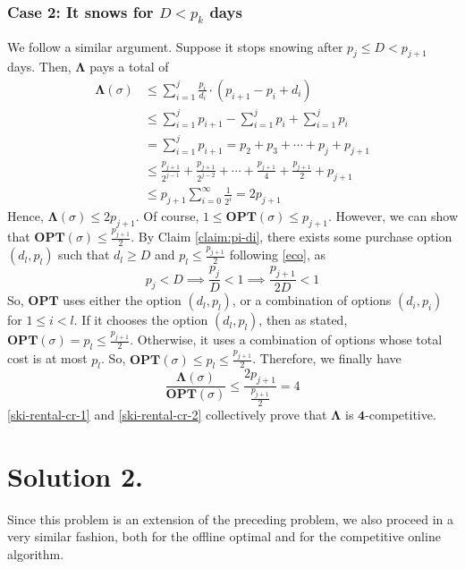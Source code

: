 \documentclass[11pt]{article}
\begin{document}
\subsubsection*{Case 2: It snows for $D < p_{k}$ days}
We follow a similar argument. Suppose it stops snowing after $p_{j} \leq D < p_{j+1}$ days. Then, $\mathbf{\Lambda}$ pays a total of
\begin{align}
    \mathbf{\Lambda}(\sigma) &\leq \sum_{i=1}^{j} \frac{p_{i}}{d_{i}} \cdot (p_{i+1} - p_{i} + d_{i}) \\
    &\leq \sum_{i=1}^{j} p_{i+1} - \sum_{i=1}^{j} p_{i} + \sum_{i=1}^{j} p_{i} \\
    &= \sum_{i=1}^{j} p_{i+1} = p_{2} + p_{3} + \cdots + p_{j} + p_{j+1} \\
    &\leq \frac{p_{j+1}}{2^{j-1}} + \frac{p_{j+1}}{2^{j-2}} + \cdots + \frac{p_{j+1}}{4} + \frac{p_{j+1}}{2} + p_{j+1} \\
    &\leq p_{j+1} \sum_{i=0}^{\infty} \frac{1}{2^{i}} = 2 p_{j+1}
\end{align}
Hence, $\mathbf{\Lambda}(\sigma) \leq 2 p_{j+1}$. Of course, $1 \leq \mathbf{OPT}(\sigma) \leq p_{j+1}$. However, we can show that
$\mathbf{OPT}(\sigma) \leq \frac{p_{j+1}}{2}$. By Claim \ref{claim:pi-di}, there exists some purchase option $(d_{l}, p_{l})$
such that $d_{l} \geq D$ and $p_{l} \leq \frac{p_{j+1}}{2}$ following \eqref{eco}, as
\begin{equation}
    p_{j} < D \implies \frac{p_{j}}{D} < 1 \implies \frac{p_{j+1}}{2D} < 1
\end{equation}
So, $\mathbf{OPT}$ uses either the option $(d_{l}, p_{l})$, or a combination of options $(d_{i}, p_{i})$ for $1 \leq i < l$. If it
chooses the option $(d_{l}, p_{l})$, then as stated, $\mathbf{OPT}(\sigma) = p_{l} \leq \frac{p_{j+1}}{2}$. Otherwise, it uses a
combination of options whose total cost is at most $p_{l}$. So, $\mathbf{OPT}(\sigma) \leq p_{l} \leq \frac{p_{j+1}}{2}$. Therefore,
we finally have
\begin{equation}
    \label{ski-rental-cr-2}
    \frac{\mathbf{\Lambda}(\sigma)}{\mathbf{OPT}(\sigma)} \leq \frac{2 p_{j+1}}{\frac{p_{j+1}}{2}} = 4
\end{equation}
\eqref{ski-rental-cr-1} and \eqref{ski-rental-cr-2} collectively prove that $\mathbf{\Lambda}$ is $\mathbf{4}$-competitive.


\section*{Solution 2.}
Since this problem is an extension of the preceding problem, we also proceed in a very similar fashion, both for the offline
optimal and for the competitive online algorithm.
\end{document}
